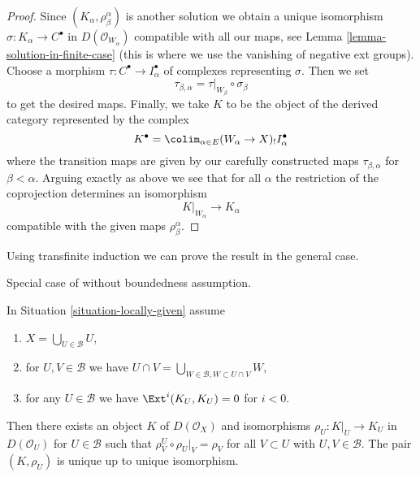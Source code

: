 \begin{proof}
Since $(K_\alpha, \rho^\alpha_\beta)$ is another solution
we obtain a unique isomorphism $\sigma : K_\alpha \to C^\bullet$
in $D(\mathcal{O}_{W_\alpha})$ compatible with all our maps, see
Lemma \ref{lemma-solution-in-finite-case}
(this is where we use the vanishing of negative ext groups).
Choose a morphism $\tau : C^\bullet \to I_\alpha^\bullet$
of complexes representing $\sigma$. Then we set
$$
\tau_{\beta, \alpha} = \tau|_{W_\beta} \circ \sigma_\beta
$$
to get the desired maps. Finally, we take $K$ to be the object of the derived
category represented by the complex
$$
K^\bullet = \colim_{\alpha \in E} (W_\alpha \to X)_!I_\alpha^\bullet
$$
where the transition maps are given by our carefully constructed
maps $\tau_{\beta, \alpha}$ for $\beta < \alpha$.
Arguing exactly as above we see that for all $\alpha$
the restriction of the coprojection determines an isomorphism
$$
K|_{W_\alpha} \longrightarrow K_\alpha
$$
compatible with the given maps $\rho^\alpha_\beta$.
\end{proof}

\noindent
Using transfinite induction we can prove the result in the general case.

\begin{theorem}
\label{theorem-glueing-bbd-general}
\begin{reference}
Special case of \cite[Theorem 3.2.4]{BBD}
without boundedness assumption.
\end{reference}
In Situation \ref{situation-locally-given} assume
\begin{enumerate}
\item $X = \bigcup_{U \in \mathcal{B}} U$,
\item for $U, V \in \mathcal{B}$ we have
$U \cap V = \bigcup_{W \in \mathcal{B}, W \subset U \cap V} W$,
\item for any $U \in \mathcal{B}$ we have $\Ext^i(K_U, K_U) = 0$
for $i < 0$.
\end{enumerate}
Then there exists an object $K$ of $D(\mathcal{O}_X)$
and isomorphisms $\rho_U : K|_U \to K_U$ in $D(\mathcal{O}_U)$ for
$U \in \mathcal{B}$ such that $\rho^U_V \circ \rho_U|_V = \rho_V$
for all $V \subset U$ with $U, V \in \mathcal{B}$.
The pair $(K, \rho_U)$ is unique up to unique isomorphism.
\end{theorem}

